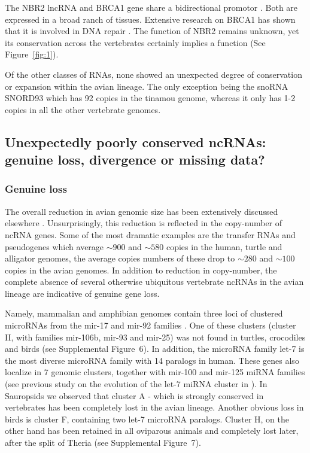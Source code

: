 \documentclass[10pt]{bmc_article}
\newenvironment{bmcformat}{\begin{raggedright}\baselineskip20pt\sloppy\setboolean{publ}{false}}{\end{raggedright}\baselineskip20pt\sloppy}
\begin{document}
\begin{bmcformat}
The NBR2 lncRNA and BRCA1 gene share a bidirectional promotor
\cite{Xu:1997}. Both are expressed in a broad ranch of
tissues. Extensive research on BRCA1 has shown that it is involved in
DNA repair \cite{Moynahan:1999}. The function of NBR2 remains unknown,
yet its conservation across the vertebrates certainly implies a
function (See Figure~\ref{fig:1}).

Of the other classes of RNAs, none showed an unexpected degree of
conservation or expansion within the avian lineage. The only exception
being the snoRNA SNORD93 which has 92 copies in the tinamou
genome, whereas it only has 1-2 copies in all the other vertebrate
genomes. 

\subsection*{Unexpectedly poorly conserved  ncRNAs: genuine loss, divergence or missing  data?}

\subsubsection*{Genuine loss}

The overall reduction in avian genomic size has been extensively
discussed elsewhere \cite{Organ:2007}. Unsurprisingly, this reduction
is reflected in the copy-number of ncRNA genes. Some of the most
dramatic examples are the transfer RNAs and pseudogenes which average
$\sim900$ and $\sim580$ copies in the human, turtle and alligator
genomes, the average copies numbers of these drop to $\sim280$ and
$\sim100$ copies in the avian genomes. In addition to reduction in
copy-number, the complete absence of several otherwise ubiquitous
vertebrate ncRNAs in the avian lineage are indicative of genuine gene
loss. 

Namely, mammalian and amphibian genomes contain three loci of
clustered microRNAs from the mir-17 and mir-92 families
\cite{Tanzer:04}. One of these clusters (cluster II, with families
mir-106b, mir-93 and mir-25) was not found in turtles, crocodiles and
birds (see Supplemental Figure~6). In addition, the microRNA family
let-7 is the most diverse microRNA family with 14 paralogs in
human. These genes also localize in 7 genomic clusters, together with
mir-100 and mir-125 miRNA families (see previous study on the
evolution of the let-7 miRNA cluster in \cite{Hertel:2012}). In Sauropsids we
observed that cluster A - which is strongly conserved in vertebrates
has been completely lost in the avian lineage.  Another obvious loss
in birds is cluster F, containing two let-7 microRNA paralogs. Cluster
H, on the other hand has been retained in all oviparous animals and
completely lost later, after the split of Theria (see Supplemental
Figure~7).


\end{bmcformat}
\end{document}

